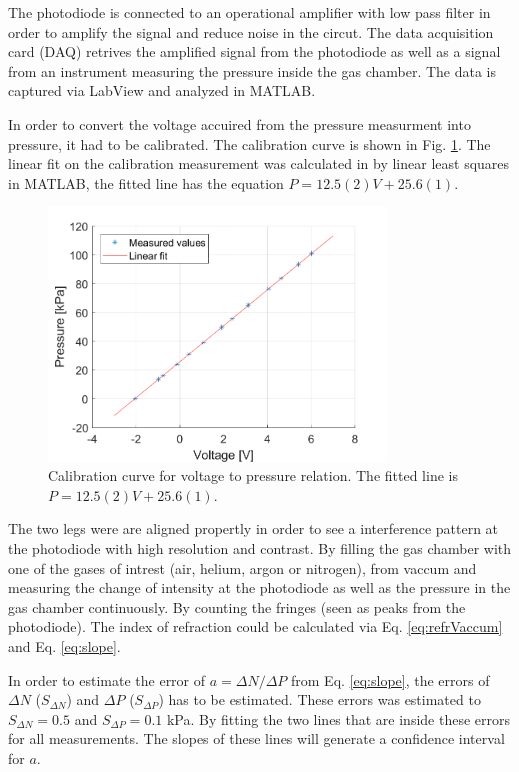 The photodiode is connected to an operational amplifier with low pass filter in order to amplify the signal and reduce noise in the circut. The data acquisition card (DAQ) retrives the amplified signal from the photodiode as well as a signal from an instrument measuring the pressure inside the gas chamber. The data is captured via LabView and analyzed in MATLAB.

In order to convert the voltage accuired from the pressure measurment into pressure, it had to be calibrated. The calibration curve is shown in Fig. \ref{fig:calibration}. The linear fit on the calibration measurement was calculated in by linear least squares in MATLAB, the fitted line has the equation $P = 12.5(2)V+25.6(1)$.


\begin{figure}[H]
  \centering
  \includegraphics[width=0.8\textwidth]{matlab/calibration.png}
  \caption{Calibration curve for voltage to pressure relation. The fitted line is $P = 12.5(2)V+25.6(1)$.}
  \label{fig:calibration}
\end{figure}

The two legs were are aligned propertly in order to see a interference pattern at the photodiode with high resolution and contrast. By filling the gas chamber with one of the gases of intrest (air, helium, argon or nitrogen), from vaccum and measuring the change of intensity at the photodiode as well as the pressure in the gas chamber continuously. By counting the fringes (seen as peaks from the photodiode). The index of refraction could be calculated via Eq. \ref{eq:refrVaccum} and Eq. \ref{eq:slope}. 




In order to estimate the error of $a =\Delta N/ \Delta P$ from Eq. \ref{eq:slope}, the errors of $\Delta N$ ($S_{\Delta N}$) and $\Delta P$ ($S_{\Delta P}$) has to be estimated. These errors was estimated to $S_{\Delta N}=0.5$ and $S_{\Delta P}=0.1$ kPa. By fitting the two lines that are inside these errors for all measurements. The slopes of these lines will generate a confidence interval for $a$.
